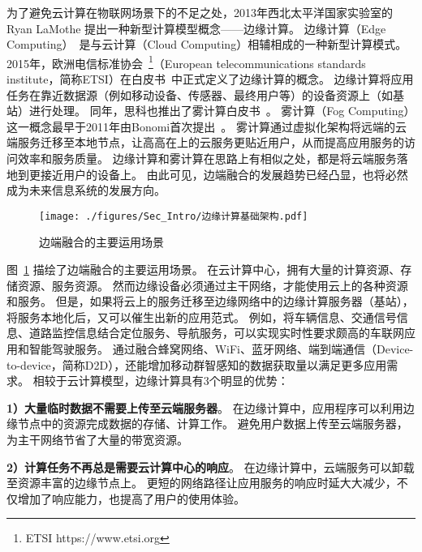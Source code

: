 为了避免云计算在物联网场景下的不足之处，2013年西北太平洋国家实验室的 Ryan LaMothe 提出一种新型计算模型概念——边缘计算。
边缘计算（Edge Computing）~\cite{DBLP:journals/cacm/ArmbrustFGJKKLPRSZ10}是与云计算（Cloud Computing）相辅相成的一种新型计算模式。
2015年，欧洲电信标准协会~\footnote{ETSI https://www.etsi.org}（European telecommunications standards institute，简称ETSI）在白皮书~\cite{hu2015mobile}中正式定义了边缘计算的概念。
边缘计算将应用任务在靠近数据源（例如移动设备、传感器、最终用户等）的设备资源上（如基站）进行处理。
同年，思科也推出了雾计算白皮书~\cite{computing2015internet}。
雾计算（Fog Computing）这一概念最早于2011年由Bonomi首次提出~\cite{bonomi2011connected}。
雾计算通过虚拟化架构将远端的云端服务迁移至本地节点，让高高在上的云服务更贴近用户，从而提高应用服务的访问效率和服务质量。
边缘计算和雾计算在思路上有相似之处，都是将云端服务落地到更接近用户的设备上。
由此可见，边端融合的发展趋势已经凸显，也将必然成为未来信息系统的发展方向。

\begin{figure}[!h]
  \centering
  \texttt{[image: ./figures/Sec\_Intro/边缘计算基础架构.pdf]}
  \vspace{-0.5em}
  \caption{边端融合的主要运用场景}
  \vspace{-1em}
  \label{Figure_EC_Architecture}
\end{figure}

图~\ref{Figure_EC_Architecture} 描绘了边端融合的主要运用场景。
在云计算中心，拥有大量的计算资源、存储资源、服务资源。
然而边缘设备必须通过主干网络，才能使用云上的各种资源和服务。
但是，如果将云上的服务迁移至边缘网络中的边缘计算服务器（基站），将服务本地化后，又可以催生出新的应用范式。
例如，将车辆信息、交通信号信息、道路监控信息结合定位服务、导航服务，可以实现实时性要求颇高的车联网应用和智能驾驶服务。
通过融合蜂窝网络、WiFi、蓝牙网络、端到端通信（Device-to-device，简称D2D），还能增加移动群智感知的数据获取量以满足更多应用需求。
相较于云计算模型，边缘计算具有3个明显的优势：

\textbf{1）大量临时数据不需要上传至云端服务器}。
在边缘计算中，应用程序可以利用边缘节点中的资源完成数据的存储、计算工作。
避免用户数据上传至云端服务器，为主干网络节省了大量的带宽资源。

\textbf{2）计算任务不再总是需要云计算中心的响应}。
在边缘计算中，云端服务可以卸载至资源丰富的边缘节点上。
更短的网络路径让应用服务的响应时延大大减少，不仅增加了响应能力，也提高了用户的使用体验。

